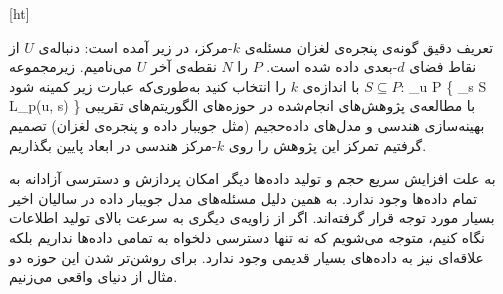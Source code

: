 [ht]

تعریف دقیق گونه‌ی پنجره‌ی لغزان مسئله‌ی $k$‌-مرکز، در زیر آمده است:
 دنباله‌ی $U$ از نقاط فضای $d$-بعدی داده شده است. $P$ را $N$ نقطه‌ی آخر $U$ می‌نامیم.
زیرمجموعه $S \subseteq P$ با اندازه‌ی $k$ را انتخاب کنید به‌طوری‌که عبارت زیر کمینه شود:
\max_{u \in P} \{ \min_{s \in S} L_p(u, s) \}
با مطالعه‌ی پژوهش‌های انجام‌شده در حوزه‌های الگوریتم‌های تقریبی بهینه‌سازی هندسی و مدل‌های داده‌حجیم (مثل جویبار داده و پنجره‌ی لغزان) تصمیم گرفتیم تمرکز این پژوهش را روی $k$-مرکز هندسی در ابعاد پایین بگذاریم.


به علت افزایش سریع حجم و تولید داده‌ها دیگر امکان پردازش و دسترسی آزادانه به تمام داده‌ها وجود ندارد. به همین دلیل مسئله‌های مدل جویبار داده در سالیان اخیر بسیار مورد توجه قرار گرفته‌اند. اگر از زاویه‌ی دیگری به سرعت بالای تولید اطلاعات نگاه کنیم، متوجه می‌شویم که نه تنها دسترسی دلخواه به تمامی داده‌ها نداریم بلکه علاقه‌ای نیز به داده‌های بسیار قدیمی وجود ندارد. برای روشن‌تر شدن این حوزه دو مثال از دنیای واقعی می‌زنیم. 


